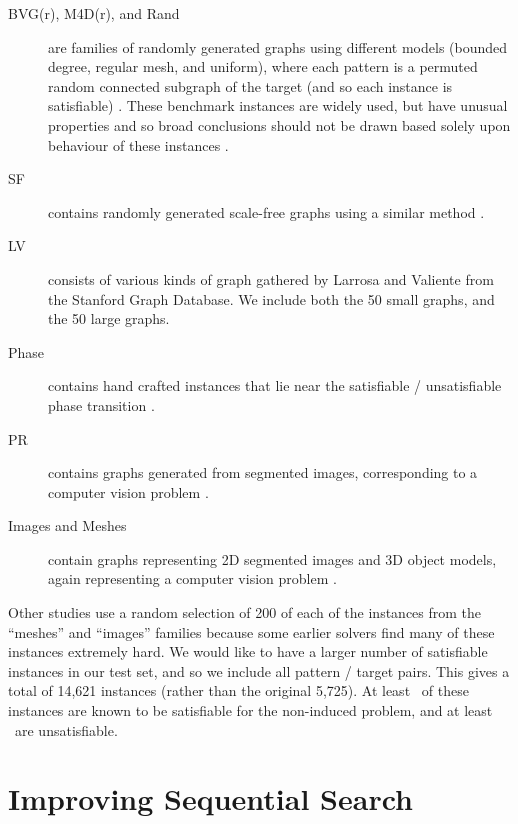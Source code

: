\documentclass[runningheads]{llncs}
\begin{document}
\begin{description}
    \item[BVG(r), M4D(r), and Rand] are families of randomly generated graphs using different models (bounded
        degree, regular mesh, and uniform), where each pattern is a permuted random connected subgraph
        of the target (and so each instance is satisfiable) \cite{DBLP:journals/pami/CordellaFSV04}.
        These benchmark instances are widely used, but have unusual properties and so broad
        conclusions should not be drawn based solely upon behaviour of these instances
        \cite{DBLP:journals/jair/McCreeshPST18}.
    \item[SF] contains randomly generated scale-free graphs using a similar method
        \cite{DBLP:journals/constraints/ZampelliDS10}.
   \item[LV] consists of various kinds of graph gathered by Larrosa and Valiente
       \cite{DBLP:journals/mscs/LarrosaV02} from the Stanford Graph Database. We include both the
        50 small graphs, and the 50 large graphs.
    \item[Phase] contains hand crafted instances that lie near the satisfiable / unsatisfiable phase
        transition \cite{DBLP:journals/jair/McCreeshPST18}.
    \item[PR] contains graphs generated from segmented images, corresponding to a computer vision
        problem \cite{DBLP:journals/pr/SolnonDHJ15}.
    \item[Images and Meshes] contain graphs representing 2D segmented images and 3D object models,
        again representing a computer vision problem \cite{DBLP:journals/cviu/DamiandSHJS11}.
\end{description}

\noindent
Other studies use a random selection of 200 of each of the instances from the ``meshes'' and
``images'' families because some earlier solvers find many of these instances extremely hard. We
would like to have a larger number of satisfiable instances in our test set, and so we include all
pattern / target pairs. This gives a total of 14,621 instances (rather than the original 5,725). At
least \unskip\ of these instances are known to be satisfiable for the
non-induced problem, and at least \unskip\ are unsatisfiable.

\section{Improving Sequential Search}
\end{document}
